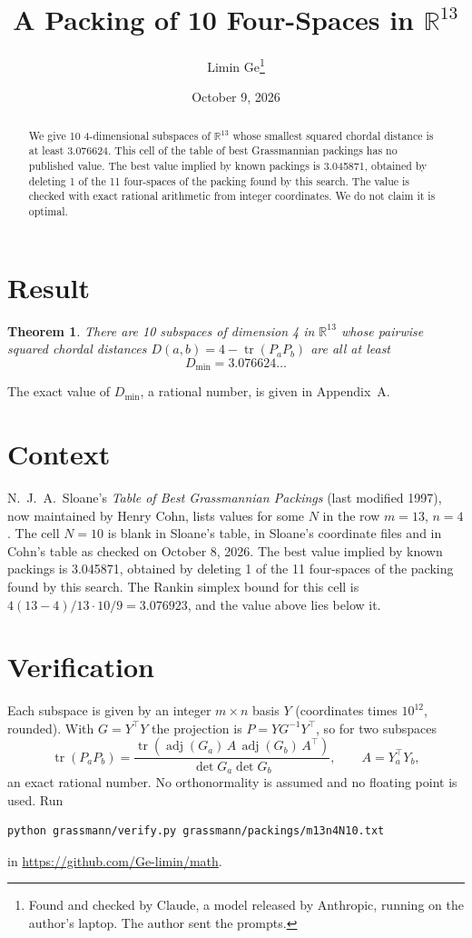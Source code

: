 \documentclass[11pt,a4paper]{article}
\title{A Packing of 10 Four-Spaces in $\mathbb{R}^{13}$}
\author{Limin Ge\thanks{Found and checked by Claude, a model released by Anthropic, running on the author's laptop. The author sent the prompts.}}
\date{October 9, 2026}
\newtheorem*{theorem}{Theorem}
\begin{document}
\maketitle
\begin{abstract}
We give 10 4-dimensional subspaces of $\mathbb{R}^{13}$ whose smallest squared chordal distance is at least 3.076624. This cell of the table of best Grassmannian packings has no published value. The best value implied by known packings is 3.045871, obtained by deleting 1 of the 11 four-spaces of the packing found by this search. The value is checked with exact rational arithmetic from integer coordinates. We do not claim it is optimal.
\end{abstract}

\section{Result}
\begin{theorem}
There are 10 subspaces of dimension 4 in $\mathbb{R}^{13}$ whose pairwise squared chordal distances $D(a,b) = 4 - \operatorname{tr}(P_aP_b)$ are all at least
\[ D_{\min} = 3.076624\ldots \]
\end{theorem}
The exact value of $D_{\min}$, a rational number, is given in Appendix~A.


\section{Context}
N.~J.~A.~Sloane's \emph{Table of Best Grassmannian Packings} (last modified 1997), now maintained by Henry Cohn, lists values for some $N$ in the row $m=13$, $n=4$. The cell $N=10$ is blank in Sloane's table, in Sloane's coordinate files and in Cohn's table as checked on October 8, 2026. The best value implied by known packings is 3.045871, obtained by deleting 1 of the 11 four-spaces of the packing found by this search. The Rankin simplex bound for this cell is $4(13-4)/13\cdot 10/9 = 3.076923$, and the value above lies below it.


\section{Verification}
Each subspace is given by an integer $m\times n$ basis $Y$ (coordinates times $10^{12}$, rounded). With $G=Y^\top Y$ the projection is $P=YG^{-1}Y^\top$, so for two subspaces
\[ \operatorname{tr}(P_aP_b)=\frac{\operatorname{tr}(\operatorname{adj}(G_a)\,A\,\operatorname{adj}(G_b)\,A^\top)}{\det G_a\det G_b},\qquad A=Y_a^\top Y_b, \]
an exact rational number. No orthonormality is assumed and no floating point is used. Run
\begin{verbatim}
python grassmann/verify.py grassmann/packings/m13n4N10.txt
\end{verbatim}
in \url{https://github.com/Ge-limin/math}.
\end{document}
